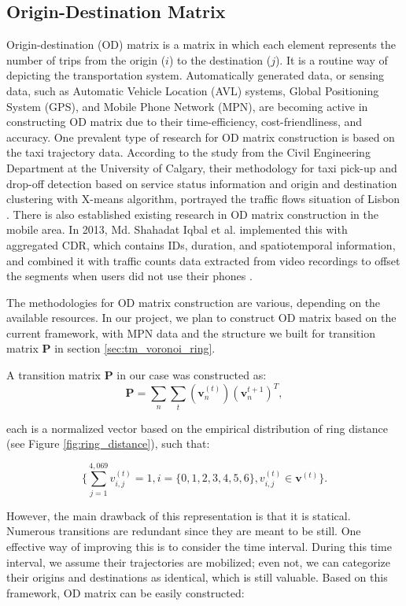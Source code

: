 \documentclass[12pt]{article}
\theoremstyle{definition}
\begin{document}
\subsection{Origin-Destination Matrix}
Origin-destination (OD) matrix is a matrix in which each element represents the number of trips from the origin (\(i\)) to the destination (\(j\)). It is a routine way of depicting the transportation system. Automatically generated data, or sensing data, such as Automatic Vehicle Location (AVL) systems, Global Positioning System (GPS), and Mobile Phone Network (MPN), are becoming active in constructing OD matrix due to their time-efficiency, cost-friendliness, and accuracy. One prevalent type of research for OD matrix construction is based on the taxi trajectory data. According to the study from the Civil Engineering Department at the University of Calgary, their methodology for taxi pick-up and drop-off detection based on service status information and origin and destination clustering with X-means algorithm, portrayed the traffic flows situation of Lisbon \cite{od_taxi_2019}. There is also established existing research in OD matrix construction in the mobile area. In 2013, Md. Shahadat Iqbal et al. implemented this with aggregated CDR, which contains IDs, duration, and spatiotemporal information, and combined it with traffic counts data extracted from video recordings to offset the segments when users did not use their phones \cite{od_mpn_2014}. 

The methodologies for OD matrix construction are various, depending on the available resources. In our project, we plan to construct OD matrix based on the current framework, with MPN data and the structure we built for transition matrix \textbf{P} in section \ref{sec:tm_voronoi_ring}. 


A transition matrix \textbf{P} in our case was constructed as:
\begin{equation*}
    \textbf{P}=\sum_{n}\sum_{t}(\boldsymbol{v}_{n}^{(t)})(\boldsymbol{v}_{n}^{t+1})^{T},
\end{equation*}

each  is a normalized vector based on the empirical distribution of ring distance (see Figure \ref{fig:ring_distance}), such that: 

\begin{equation*}
    \{\sum_{j=1}^{4,069} v_{i,j}^{(t)}=1, i=\{0,1,2,3,4,5,6\}, v_{i,j}^{(t)} \in \boldsymbol{v}^{(t)} \}.
\end{equation*}

However, the main drawback of this representation is that it is statical. Numerous transitions are redundant since they are meant to be still. One effective way of improving this is to consider the time interval. During this time interval, we assume their trajectories are mobilized; even not, we can categorize their origins and destinations as identical, which is still valuable. Based on this framework, OD matrix can be easily constructed:
\end{document}

